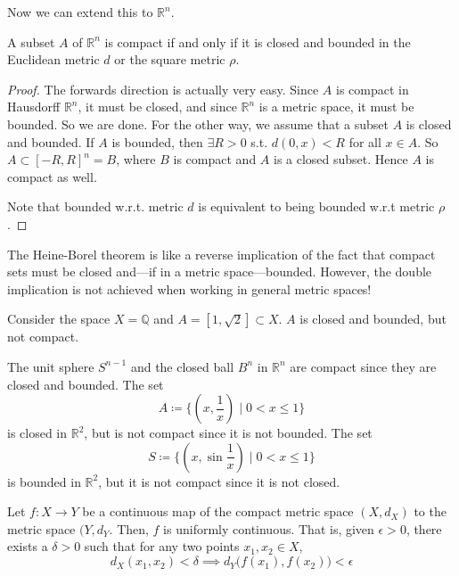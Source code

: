   Now we can extend this to $\mathbb{R}^n$. 

  \begin{theorem}
    A subset $A$ of $\mathbb{R}^n$ is compact if and only if it is closed and bounded in the Euclidean metric $d$ or the square metric $\rho$. 
  \end{theorem}
  \begin{proof}
    The forwards direction is actually very easy. Since $A$ is compact in Hausdorff $\mathbb{R}^n$, it must be closed, and since $\mathbb{R}^n$ is a metric space, it must be bounded. So we are done. For the other way, we assume that a subset $A$ is closed and bounded. If $A$ is bounded, then $\exists R > 0$ s.t. $d(0, x) < R$ for all $x \in A$. So $A \subset [-R, R]^n = B$, where $B$ is compact and $A$ is a closed subset. Hence $A$ is compact as well. 

    Note that bounded w.r.t. metric $d$ is equivalent to being bounded w.r.t metric $\rho$. 
  \end{proof}

  The Heine-Borel theorem is like a reverse implication of the fact that compact sets must be closed and---if in a metric space---bounded. However, the double implication is not achieved when working in general metric spaces!

  \begin{example}
    Consider the space $X = \mathbb{Q}$ and $A = [1, \sqrt{2}] \subset X$. $A$ is closed and bounded, but not compact. 
  \end{example}

  \begin{example}
    The unit sphere $S^{n-1}$ and the closed ball $B^n$ in $\mathbb{R}^n$ are compact since they are closed and bounded. The set
    \begin{equation}
      A \coloneqq \{(x, \frac{1}{x}) \; | \; 0 < x \leq 1\}
    \end{equation}
    is closed in $\mathbb{R}^2$, but is not compact since it is not bounded. The set 
    \begin{equation}
      S \coloneqq \{(x, \sin{\frac{1}{x}}) \; | \; 0<x\leq 1\}
    \end{equation}
    is bounded in $\mathbb{R}^2$, but it is not compact since it is not closed. 
  \end{example}

  \begin{theorem}
    Let $f: X \rightarrow Y$ be a continuous map of the compact metric space $(X,d_X)$ to the metric space $(Y, d_Y$. Then, $f$ is uniformly continuous. That is, given $\epsilon > 0$, there exists a $\delta > 0$ such that for any two points $x_1, x_2 \in X$, 
    \begin{equation}
      d_X (x_1, x_2) < \delta \implies d_Y \big( f(x_1), f(x_2)\big) < \epsilon
    \end{equation}
  \end{theorem}

